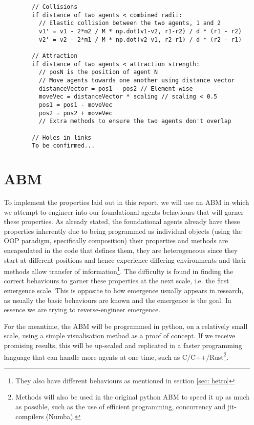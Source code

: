 \documentclass{article}
\begin{document}
      \begin{verbatim}
        // Collisions
        if distance of two agents < combined radii:
          // Elastic collision between the two agents, 1 and 2
          v1' = v1 - 2*m2 / M * np.dot(v1-v2, r1-r2) / d * (r1 - r2) 
          v2' = v2 - 2*m1 / M * np.dot(v2-v1, r2-r1) / d * (r2 - r1)

        // Attraction
        if distance of two agents < attraction strength:
          // posN is the position of agent N
          // Move agents towards one another using distance vector 
          distanceVector = pos1 - pos2 // Element-wise 
          moveVec = distanceVector * scaling // scaling < 0.5
          pos1 = pos1 - moveVec
          pos2 = pos2 + moveVec
          // Extra methods to ensure the two agents don't overlap

        // Holes in links
        To be confirmed...
      \end{verbatim}


\section{ABM}

To implement the properties laid out in this report, we will use an ABM in which we attempt to engineer into our foundational agents behaviours that will garner these properties. As already stated, the foundational agents already have these properties inherently due to being programmed as individual objects (using the OOP paradigm, specifically composition) their properties and methods are encapsulated in the code that defines them, they are heterogeneous since they start at different positions and hence experience differing environments and their methods allow transfer of information\footnote{They also have different behaviours as mentioned in section \ref{sec: hetro}}. The difficulty is found in finding the correct behaviours to garner these properties at the next scale, i.e. the first emergence scale. This is opposite to how emergence usually appears in research, as usually the basic behaviours are known and the emergence is the goal. In essence we are trying to reverse-engineer emergence.

  For the meantime, the ABM will be programmed in python, on a relatively small scale, using a simple visualisation method as a proof of concept. If we receive promising results, this will be up-scaled and replicated in a faster programming language that can handle more agents at one time, such as C/C++/Rust\footnote{Methods will also be used in the original python ABM to speed it up as much as possible, such as the use of efficient programming, concurrency and jit-compilers (Numba).}. 
\end{document}
